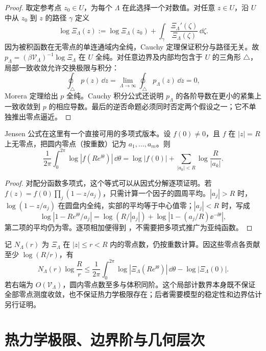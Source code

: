 \begin{proof}
取定参考点 \(z_0\in U\)，为每个 \(\Lambda\) 在此选择一个对数值。对任意 \(z\in U\)，沿 \(U\) 中从 \(z_0\) 到 \(z\) 的路径 \(\gamma\) 定义
\[
 \log\Xi_\Lambda(z)
 :=\log\Xi_\Lambda(z_0)
 +\int_\gamma\frac{\Xi_\Lambda'(\zeta)}{\Xi_\Lambda(\zeta)}\,\dd\zeta.
\]
因为被积函数在无零点的单连通域内全纯，Cauchy 定理保证积分与路径无关。故 \(p_\Lambda=(\beta\mathcal V_\Lambda)^{-1}\log\Xi_\Lambda\) 在 \(U\) 全纯。对任意边界及内部均包含于 \(U\) 的三角形 \(\triangle\)，局部一致收敛允许交换极限与积分：
\[
 \oint_\triangle p(z)\,\dd z
 =\lim_{\Lambda\to\infty}\oint_\triangle p_\Lambda(z)\,\dd z
 =0,
\]
Morera 定理给出 \(p\) 全纯。Cauchy 积分公式还说明 \(p_\Lambda\) 的各阶导数在更小的紧集上一致收敛到 \(p\) 的相应导数。最后的逆否命题必须同时否定两个假设之一；它不单独推出零点逼近。
\end{proof}

\begin{theorem}
Jensen 公式在这里有一个直接可用的多项式版本。设 $f(0)\ne0$，且 $f$ 在 $|z|=R$ 上无零点，把圆内零点（按重数）记为 $a_1,\ldots,a_m$。则
\begin{equation}
 \frac1{2\pi}\int_0^{2\pi}\log|f(Re^{\ii\theta})|\,\dd\theta
 =\log|f(0)|+\sum_{|a_k|<R}\log\frac{R}{|a_k|}.
 \label{eq:phys-sm-jensen-formula}
\end{equation}
\end{theorem}
\begin{proof}
对配分函数多项式，这个等式可以从因式分解逐项证明。若 $f(z)=f(0)\prod_j(1-z/a_j)$，只需计算一个因子的圆周平均。$|a_j|>R$ 时，$\log(1-z/a_j)$ 在圆盘内全纯，实部的平均等于中心值零；$|a_j|<R$ 时，写成
\[
 \log|1-Re^{\ii\theta}/a_j|
 =\log(R/|a_j|)
  +\log|1-(a_j/R)\ee^{-\ii\theta}|,
\]
第二项的平均仍为零。逐项相加便得到 ，不需要把多项式推广为亚纯函数。
\end{proof}

记 $N_\Lambda(r)$ 为 $\Xi_\Lambda$ 在 $|z|\le r<R$ 内的零点数，仍按重数计算。因这些零点各贡献至少 $\log(R/r)$，有
\begin{equation}
 N_\Lambda(r)\log\frac Rr
 \le \frac1{2\pi}\int_0^{2\pi}
       \log|\Xi_\Lambda(Re^{\ii\theta})|\,\dd\theta
       -\log|\Xi_\Lambda(0)|.
 \label{eq:phys-sm-jensen-zero-bound}
\end{equation}
若右端为 $O(\mathcal V_\Lambda)$，圆内零点数至多与体积同阶。这个局部计数界本身既不保证全部零点测度收敛，也不保证热力学极限存在；后者需要模型的稳定性和边界估计另行证明。
\section{热力学极限、边界阶与几何层次}

